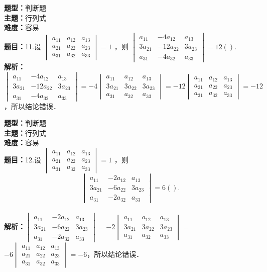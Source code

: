 \documentclass{ctexart}
\newenvironment{question}[5]{%
	\noindent\textbf{题型：}#1\\
	\textbf{主题：}#2\\
	\textbf{难度：}#3\\
	\textbf{题目：}#4\\
	\textbf{解析：}#5\\
	\vspace{1em}
}{}
\begin{document}
	
	\begin{question}
		{判断题}
		{行列式}
		{容易}
		{11.设 $\begin{vmatrix}a_{11} & a_{12} & a_{13} \\ a_{21} & a_{22} & a_{23} \\ a_{31} & a_{32} & a_{33}\end{vmatrix}=1$ ，则 $\begin{vmatrix}a_{11} & -4 a_{12} & a_{13} \\ 3 a_{21} & -12 a_{22} & 3 a_{23} \\ a_{31} & -4 a_{32} & a_{33}\end{vmatrix}=12(  ).$}
		{$\begin{vmatrix}a_{11} & -4 a_{12} & a_{13} \\ 3 a_{21} & -12 a_{22} & 3 a_{23} \\ a_{31} & -4 a_{32} & a_{33}\end{vmatrix}=-4\begin{vmatrix}a_{11} & a_{12} & a_{13} \\ 3 a_{21} & 3 a_{22} & 3 a_{23} \\ a_{31} & a_{32} & a_{33}\end{vmatrix}=-12\begin{vmatrix}a_{11} & a_{12} & a_{13} \\ a_{21} & a_{22} & a_{23} \\ a_{31} & a_{32} & a_{33}\end{vmatrix}=-12$，所以结论错误．}
	\end{question}
	
	\begin{question}
		{判断题}
		{行列式}
		{容易}
		{12.设 $\begin{vmatrix}a_{11} & a_{12} & a_{13} \\ a_{21} & a_{22} & a_{23} \\ a_{31} & a_{32} & a_{33}\end{vmatrix}=1$ ，则
			$$
			\begin{vmatrix}
				a_{11} & -2 a_{12} & a_{13} \\
				3 a_{21} & -6 a_{22} & 3 a_{23} \\
				a_{31} & -2 a_{32} & a_{33}
			\end{vmatrix}=6(  ).
			$$
		}
		{$\begin{vmatrix}a_{11} & -2 a_{12} & a_{13} \\ 3 a_{21} & -6 a_{22} & 3 a_{23} \\ a_{31} & -2 a_{32} & a_{33}\end{vmatrix}=-2\begin{vmatrix}a_{11} & a_{12} & a_{13} \\ 3 a_{21} & 3 a_{22} & 3 a_{23} \\ a_{31} & a_{32} & a_{33}\end{vmatrix}=$ $-6\begin{vmatrix}a_{11} & a_{12} & a_{13} \\ a_{21} & a_{22} & a_{23} \\ a_{31} & a_{32} & a_{33}\end{vmatrix}=-6$，所以结论错误．}
	\end{question}
	
\end{document}
